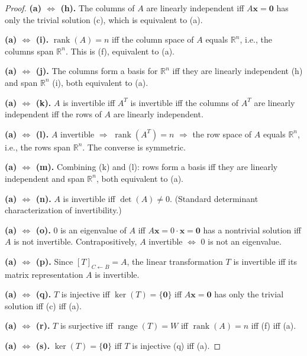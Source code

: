 \documentclass[11pt]{article}
\theoremstyle{definition}
\begin{document}
\begin{proof}
\medskip
\noindent\textbf{(a) $\Leftrightarrow$ (h).}
The columns of $A$ are linearly independent iff $A\mathbf{x} = \mathbf{0}$ has only the trivial solution (c), which is equivalent to (a).

\medskip
\noindent\textbf{(a) $\Leftrightarrow$ (i).}
$\operatorname{rank}(A) = n$ iff the column space of $A$ equals $\mathbb{R}^n$, i.e., the columns span $\mathbb{R}^n$. This is (f), equivalent to (a).

\medskip
\noindent\textbf{(a) $\Leftrightarrow$ (j).}
The columns form a basis for $\mathbb{R}^n$ iff they are linearly independent (h) and span $\mathbb{R}^n$ (i), both equivalent to (a).

\medskip
\noindent\textbf{(a) $\Leftrightarrow$ (k).}
$A$ is invertible iff $A^T$ is invertible iff the columns of $A^T$ are linearly independent iff the rows of $A$ are linearly independent.

\medskip
\noindent\textbf{(a) $\Leftrightarrow$ (l).}
$A$ invertible $\Rightarrow$ $\operatorname{rank}(A^T) = n$ $\Rightarrow$ the row space of $A$ equals $\mathbb{R}^n$, i.e., the rows span $\mathbb{R}^n$. The converse is symmetric.

\medskip
\noindent\textbf{(a) $\Leftrightarrow$ (m).}
Combining (k) and (l): rows form a basis iff they are linearly independent and span $\mathbb{R}^n$, both equivalent to (a).

\medskip
\noindent\textbf{(a) $\Leftrightarrow$ (n).}
$A$ is invertible iff $\det(A) \neq 0$. (Standard determinant characterization of invertibility.)

\medskip
\noindent\textbf{(a) $\Leftrightarrow$ (o).}
$0$ is an eigenvalue of $A$ iff $A\mathbf{x} = 0\cdot\mathbf{x} = \mathbf{0}$ has a nontrivial solution iff $A$ is not invertible. Contrapositively, $A$ invertible $\Leftrightarrow$ $0$ is not an eigenvalue.

\medskip
\noindent\textbf{(a) $\Leftrightarrow$ (p).}
Since $[T]_{C\leftarrow B} = A$, the linear transformation $T$ is invertible iff its matrix representation $A$ is invertible.

\medskip
\noindent\textbf{(a) $\Leftrightarrow$ (q).}
$T$ is injective iff $\ker(T) = \{\mathbf{0}\}$ iff $A\mathbf{x} = \mathbf{0}$ has only the trivial solution iff (c) iff (a).

\medskip
\noindent\textbf{(a) $\Leftrightarrow$ (r).}
$T$ is surjective iff $\operatorname{range}(T) = W$ iff $\operatorname{rank}(A) = n$ iff (f) iff (a).

\medskip
\noindent\textbf{(a) $\Leftrightarrow$ (s).}
$\ker(T) = \{\mathbf{0}\}$ iff $T$ is injective (q) iff (a).


\end{proof}
\end{document}
